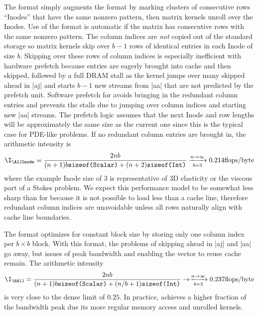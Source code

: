 The {\AIJInode} format simply augments the {\AIJ} format by marking clusters of consecutive rows ``Inodes'' that have the same nonzero pattern, then matrix kernels unroll over the Inodes.
Use of the {\AIJInode} format is automatic if the matrix has consecutive rows with the same nonzero pattern.
The column indices are \emph{not} copied out of the standard {\AIJ} storage so matrix kernels skip over $b-1$ rows of identical entries in each Inode of size $b$.
Skipping over these rows of column indices is especially inefficient with hardware prefetch because entries are eagerly brought into cache and then skipped, followed by a full DRAM stall as the kernel jumps over many skipped ahead in \cverb|aj| and starts $b-1$ new streams from \cverb|aa| that are not predicted by the prefetch unit.
Software prefetch for {\AIJInode} avoids bringing in the redundant column entries and prevents the stalls due to jumping over column indices and starting new \cverb|aa| streams.
The prefetch logic assumes that the next Inode and row lengths will be approximately the same size as the current one since this is the typical case for PDE-like problems.
If no redundant column entries are brought in, the arithmetic intensity is
\begin{align*}
  \I_{{\AIJInode}} = \frac{2nb}{(n+1)b\texttt{sizeof(Scalar)} + (n+2)\texttt{sizeof(Int)}} \xrightarrow[b=3]{n\to\infty} 0.214 \text{flops/byte}
\end{align*}
where the example Inode size of 3 is representative of 3D elasticity or the viscous part of a Stokes problem.
We expect this performance model to be somewhat less sharp than for {\AIJ} because it is not possible to load less than a cache line, therefore redundant column indices are unavoidable unless all rows naturally align with cache line boundaries.

The {\BAIJ} format optimizes for constant block size by storing only one column index per $b\times b$ block.
With this format, the problems of skipping ahead in \cverb|aj| and \cverb|aa| go away, but issues of peak bandwidth and enabling the vector to reuse cache remain.
The arithmetic intensity
\begin{align*}
  \I_{{\BAIJ}} = \frac{2nb}{(n+1)b\texttt{sizeof(Scalar)} + (n/b+1)\texttt{sizeof(Int)}} \to \xrightarrow[b=3]{n\to\infty} 0.237 \text{flops/byte}
\end{align*}
is very close to the dense limit of $0.25$.
In practice, {\BAIJ} achieves a higher fraction of the bandwidth peak due its more regular memory access and unrolled kernels.

